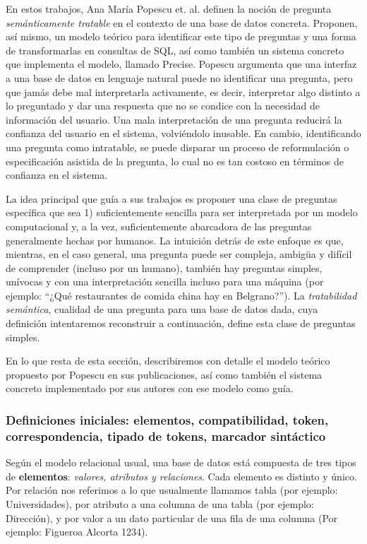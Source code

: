 En estos trabajos, Ana María Popescu et. al. definen la noción de pregunta \textit{semánticamente tratable} en el contexto de una base de datos concreta. Proponen, así mismo, un modelo teórico para identificar este tipo de preguntas y una forma de transformarlas en consultas de SQL, así como también un sistema concreto que implementa el modelo, llamado Precise. Popescu argumenta que una interfaz a una base de datos en lenguaje natural puede no identificar una pregunta, pero que jamás debe mal interpretarla activamente, es decir, interpretar algo distinto a lo preguntado y dar una respuesta que no se condice con la necesidad de información del usuario. Una mala interpretación de una pregunta reducirá la confianza del usuario en el sistema, volviéndolo inusable. En cambio, identificando una pregunta como intratable, se puede disparar un proceso de reformulación o especificación asistida de la pregunta, lo cual no es tan costoso en términos de confianza en el sistema.

La idea principal que guía a sus trabajos es proponer una clase de preguntas específica que sea 1) suficientemente sencilla para ser interpretada por un modelo computacional y, a la vez, suficientemente abarcadora de las preguntas generalmente hechas por humanos. La intuición detrás de este enfoque es que, mientras, en el caso general, una pregunta puede ser compleja, ambigüa y difícil de comprender (incluso por un humano), también hay preguntas simples, unívocas y con una interpretación sencilla incluso para una máquina (por ejemplo: ``¿Qué restaurantes de comida china hay en Belgrano?''). La \textit{tratabilidad semántica}, cualidad de una pregunta para una base de datos dada, cuya definición intentaremos reconstruir a continuación, define esta clase de preguntas simples.

En lo que resta de esta sección, describiremos con detalle el modelo teórico propuesto por Popescu en sus publicaciones, así como también el sistema concreto implementado por sus autores con ese modelo como guía.

\subsubsection*{Definiciones iniciales: elementos, compatibilidad, token, correspondencia, tipado de tokens, marcador sintáctico}

Según el modelo relacional usual, una base de datos está compuesta de tres tipos de \textbf{elementos}: \textit{valores, atributos y relaciones}. Cada elemento es distinto y único. Por relación nos referimos a lo que usualmente llamamos tabla (por ejemplo: Universidades), por atributo a una columna de una tabla (por ejemplo: Dirección), y por valor a un dato particular de una fila de una columna (Por ejemplo: Figueroa Alcorta 1234).

